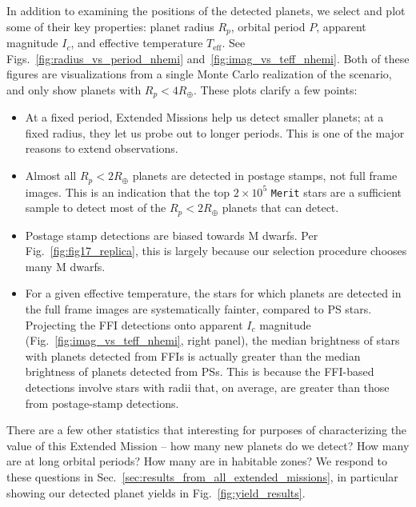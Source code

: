 In addition to examining the positions of the detected planets, we select and plot some of their key properties:
planet radius $R_p$, orbital period $P$, apparent magnitude $I_c$, and effective temperature $T_\mathrm{eff}$.
See Figs.~\ref{fig:radius_vs_period_nhemi} and~\ref{fig:imag_vs_teff_nhemi}.
Both of these figures are visualizations from a single Monte Carlo realization of the \nhemi\:scenario, and only show planets with $R_p < 4R_\oplus$.
These plots clarify a few points:
\begin{itemize}
	\item At a fixed period, Extended Missions help us detect smaller planets; at a fixed radius, they let us probe out to longer periods. This is one of the major reasons to extend \tesss observations.
	\item Almost all $R_p<2R_\oplus$ planets are detected in postage stamps, not full frame images. This is an indication that the top $2\times10^5$ \texttt{Merit} stars are a sufficient sample to detect most of the $R_p<2R_\oplus$ planets that \tess can detect.
	\item Postage stamp detections are biased towards M dwarfs. Per Fig.~\ref{fig:fig17_replica}, this is largely because our selection procedure chooses many M dwarfs.
	\item For a given effective temperature, the stars for which planets are detected in the full frame images are systematically fainter, compared to PS stars. Projecting the FFI detections onto apparent $I_c$ magnitude (Fig.~\ref{fig:imag_vs_teff_nhemi}, right panel), the median brightness of stars with planets detected from FFIs is actually greater than the median brightness of planets detected from PSs. This is because the FFI-based detections involve stars with radii that, on average, are greater than those from postage-stamp detections.
\end{itemize}

There are a few other statistics that interesting for purposes of characterizing the value of this Extended Mission -- how many new planets do we detect? How many are at long orbital periods? How many are in habitable zones? We respond to these questions in Sec.~\ref{sec:results_from_all_extended_missions}, in particular showing our detected planet yields in Fig.~\ref{fig:yield_results}.
